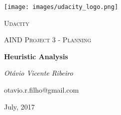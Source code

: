 \documentclass[12pt, a4paper]{article}
\begin{document}
	
\pagestyle{plain}

\begin{titlepage}
\centering
\texttt{[image: images/udacity\_logo.png]}\par\vspace{1cm}
{\scshape\LARGE Udacity \par}
\vspace{1cm}
{\scshape\Large AIND Project 3 - Planning\par}
\vspace{1.5cm}
{\huge\bfseries Heuristic Analysis\par}
\vspace{2cm}
{\Large\itshape Otávio Vicente Ribeiro\par}
{\large\ttfamily otavio.r.filho@gmail.com\par}

\vfill

{July, 2017\par}
\end{titlepage}	

\tableofcontents
\newpage
{}






\end{document}
